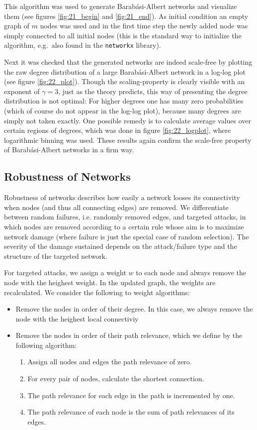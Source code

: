 \documentclass{scrartcl}
\begin{document}
 This algorithm was used to generate Barab\'asi-Albert
networks and visualize them (see figures \ref{fig:21_begin} and \ref{fig:21_end}).
As initial condition an empty graph of $m$ nodes was used and in the first
time step the newly added node was simply connected to all initial nodes
(this is the standard way to initialize the algorithm, e.g.\ also found in
the \texttt{networkx} library).

 Next it was checked that the generated networks are indeed scale-free 
by plotting the raw degree distribution of a large Barab\'asi-Albert network
 in a log-log plot (see figure \ref{fig:22_plot}). Though the
scaling-property is clearly visible with an exponent of $\gamma = 3$, just
as the theory predicts, this way of presenting the degree distribution is
not optimal: For higher degrees one has many zero probabilities
(which of course do not appear in the log-log plot), because many degrees are
simply not taken exactly. One possible remedy is to calculate average
values over certain regions of degrees, which was done in figure
\ref{fig:22_logplot}, where logarithmic binning was used. These results
again confirm the scale-free property of Barab\'asi-Albert networks in a firm way.

\subsection{Robustness of Networks}
Robustness of networks describes how easily a network looses its connectivity when nodes (and thus all connecting edges) are removed. We differentiate between random failures, i.e. randomly removed edges, and targeted attacks, in which nodes are removed according to a certain rule whose aim is to maximize network damage (where failure is just the special case of random selection). The severity of the damage sustained depends on the attack/failure type and the structure of the targeted network. 

For targeted attacks, we assign a weight $w$ to each node and always remove the node with the heighest weight. In the updated graph, the weights are recalculated. We consider the following to weight algorithms:
\begin{itemize}
\item Remove the nodes in order of their degree. In this case, we always remove the node with the heighest local connectiviy
\item Remove the nodes in order of their path relevance, which we define by the following algorithm:
	\begin{enumerate}
	\item Assign all nodes and edges the path relevance of zero.
	\item For every pair of nodes, calculate the shortest connection.
	\item The path relevance for each edge in the path is incremented by one.
	\item The path relevance of each node is the sum of path relevances of its edges.
	\end{enumerate}
\end{itemize}
\end{document}
